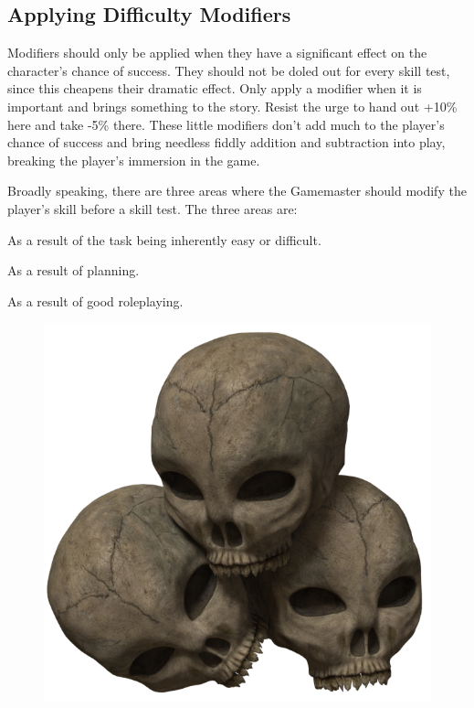 \subsection{Applying Difficulty Modifiers}
\label{ssec:when-to-apply-difficulty-modifies}
Modifiers should only be applied when they have a significant effect on the character’s chance of success. They should not be doled out for every skill test, since this cheapens their dramatic effect. Only apply a modifier when it is important and brings something to the story. Resist the urge to hand out +10\% here and take {-5\%} there. These little modifiers don’t add much to the player’s chance of success and bring needless fiddly addition and subtraction into play, breaking the player’s immersion in the game.

Broadly speaking, there are three areas where the Gamemaster should modify the player’s skill before a skill test. The three areas are:

\begin{rpg-list}
	\item As a result of the task being inherently easy or difficult.\\
	\item As a result of planning.\\
	\item As a result of good roleplaying.
\end{rpg-list}

\begin{figure}[h]
\begin{center}
\includegraphics[scale=0.2]{img/SkullPile.png}
\end{center}
\end{figure}



